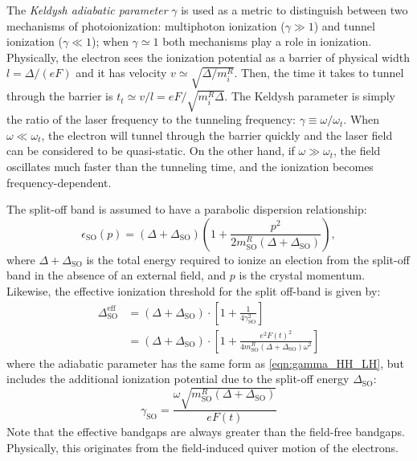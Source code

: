 The \textit{Keldysh adiabatic parameter} $\gamma$ is used as a metric to distinguish between two mechanisms of photoionization: multiphoton ionization ($\gamma \gg 1$) and tunnel ionization ($\gamma \ll 1$); when $\gamma \simeq 1$ both mechanisms play a role in ionization. Physically, the electron sees the ionization potential as a barrier of physical width $l = \Delta / (e F)$ and it has velocity $v \simeq \sqrt{\Delta / m_i^R}$. Then, the time it takes to tunnel through the barrier is $t_t \simeq v/l = eF / \sqrt{m_i^R \Delta}$. The Keldysh parameter is simply the ratio of the laser frequency to the tunneling frequency: $\gamma \equiv \omega / \omega_t$. When $\omega \ll \omega_t$, the electron will tunnel through the barrier quickly and the laser field can be considered to be quasi-static. On the other hand, if $\omega \gg \omega_t$, the field oscillates much faster than the tunneling time, and the ionization becomes frequency-dependent.

The split-off band is assumed to have a parabolic dispersion relationship:
\begin{equation}
\epsilon_{\textrm{SO}}(p) = (\Delta+\Delta_{\textrm{SO}}) \left( 1 + \frac{p^2}{2 m_{\textrm{SO}}^R (\Delta+\Delta_{\textrm{SO}})}  \right),
\end{equation}
where $\Delta + \Delta_{\textrm{SO}}$ is the total energy required to ionize an election from the split-off band in the absence of an external field, and $p$ is the crystal momentum. Likewise, the effective ionization threshold for the split off-band is given by:
\begin{equation}
\begin{aligned}
\Delta_{\textrm{SO}}^{\textrm{eff}} &= (\Delta + \Delta_{\textrm{SO}}) \cdot \left[ 1 + \frac{1}{4 \gamma^2_{\textrm{SO}}} \right] \\
&= (\Delta + \Delta_{\textrm{SO}}) \cdot \left[1 + \frac{e^2 F(t)^2}{4 m_{\textrm{SO}}^R (\Delta + \Delta_{\textrm{SO}}) \omega^2} \right]
\end{aligned}
\label{eqn:eff_bandgap_SO}
\end{equation}
where the adiabatic parameter has the same form as \cref{eqn:gamma_HH_LH}, but includes the additional ionization potential due to the split-off energy $\Delta_{\textrm{SO}}$:
\begin{equation}
\label{eqn:gamma_SO}
\gamma_{\textrm{SO}} = \frac{\omega \sqrt{m_{\textrm{SO}}^R (\Delta + \Delta_{\textrm{SO}})}}{e F(t)}
\end{equation}
Note that the effective bandgaps are always greater than the field-free bandgaps. Physically, this originates from the field-induced quiver motion of the electrons.


